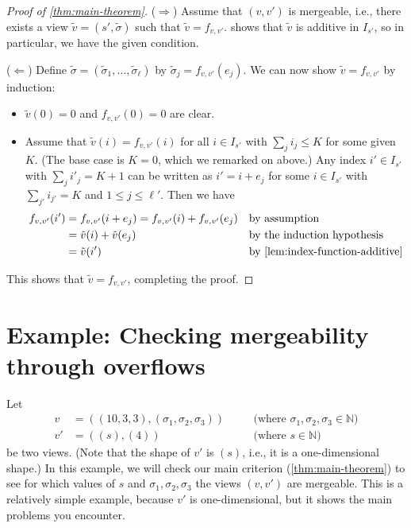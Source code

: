 \documentclass{article}
\theoremstyle{definition} %
\newcommand{\bN}{\mathbb{N}}
\begin{document}
\begin{proof}[Proof of \cref{thm:main-theorem}]
  ($\Rightarrow$)
  Assume that $(v, v')$ is mergeable, i.e.,
  there exists a view $\tilde v = (s', \tilde \sigma)$ such that $\tilde v = f_{v, v'}$.
   shows that $\tilde v$ is additive in $I_{s'}$,
  so in particular, we have the given condition.

  ($\Leftarrow$)
  Define $\tilde \sigma = (\tilde \sigma_1, \ldots, \tilde \sigma_\ell)$ by
  $\tilde \sigma_j = f_{v, v'}(e_j)$.
  We can now show $\tilde v = f_{v, v'}$ by induction:
  \begin{itemize}
    \item $\tilde v(0) = 0$ and $f_{v, v'}(0) = 0$ are clear.
    \item
      Assume that $\tilde v(i) = f_{v, v'}(i)$ for all $i \in I_{s'}$
      with $\sum_j i_j \leq K$ for some given $K$. (The base case is $K = 0$,
      which we remarked on above.)
      Any index $i' \in I_{s'}$ with $\sum_j i'_j = K + 1$
      can be written as $i' = i + e_j$ for some $i \in I_{s'}$ with $\sum_{j'} i_{j'} = K$ and $1 \leq j \leq \ell'$.
      Then we have
      \begin{align*}
          f_{v, v'}(i') 
          &= f_{v, v'}(i + e_j) = f_{v, v'}(i) + f_{v, v'}(e_j) && \text{by assumption} \\
           &= \tilde v(i) + \tilde v(e_j) && \text{by the induction hypothesis} \\
           &= \tilde v(i') && \text{by \cref{lem:index-function-additive}}
      \end{align*}
  \end{itemize}

  This shows that $\tilde v = f_{v, v'}$, completing the proof.
\end{proof}

\section{Example: Checking mergeability through overflows}
\label{sec:worked_out_example}

Let
\begin{align*}
  v &= ((10, 3, 3), (\sigma_1, \sigma_2, \sigma_3)) && \quad \text{(where $\sigma_1, \sigma_2, \sigma_3 \in \bN$)} \\
  v' &= ((s), (4)) &&\quad \text{(where $s \in \bN$)}
\end{align*}
be two views.
(Note that the shape of $v'$ is $(s)$, i.e., it is a one-dimensional shape.)
In this example,
we will check our main criterion (\cref{thm:main-theorem})
to see for which values of $s$ and $\sigma_1, \sigma_2, \sigma_3$
the views $(v, v')$ are mergeable.
This is a relatively simple example, because $v'$ is one-dimensional,
but it shows the main problems you encounter.
\end{document}

